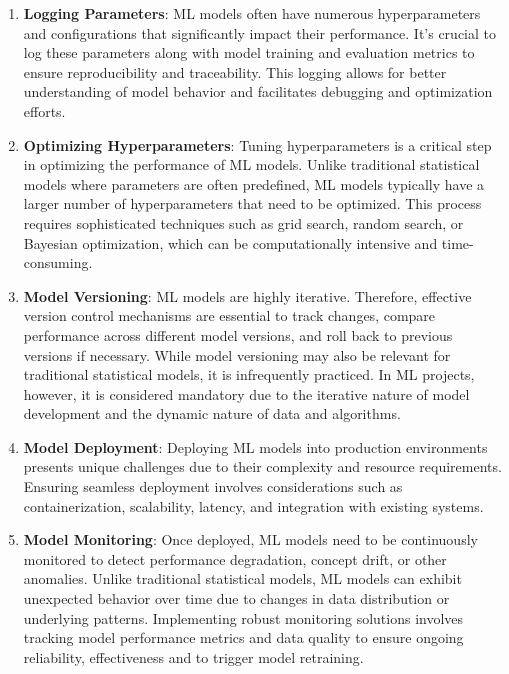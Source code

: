 \begin{enumerate}
    \item \textbf{Logging Parameters}: ML models often have numerous hyperparameters and configurations that significantly impact their performance. It's crucial to log these parameters along with model training and evaluation metrics to ensure reproducibility and traceability. This logging allows for better understanding of model behavior and facilitates debugging and optimization efforts.
    
    \item \textbf{Optimizing Hyperparameters}: Tuning hyperparameters is a critical step in optimizing the performance of ML models. Unlike traditional statistical models where parameters are often predefined, ML models typically have a larger number of hyperparameters that need to be optimized. This process requires sophisticated techniques such as grid search, random search, or Bayesian optimization, which can be computationally intensive and time-consuming.
    
    \item \textbf{Model Versioning}: ML models are highly iterative. Therefore, effective version control mechanisms are essential to track changes, compare performance across different model versions, and roll back to previous versions if necessary. While model versioning may also be relevant for traditional statistical models, it is infrequently practiced. In ML projects, however, it is considered mandatory due to the iterative nature of model development and the dynamic nature of data and algorithms.
    
    \item \textbf{Model Deployment}: Deploying ML models into production environments presents unique challenges due to their complexity and resource requirements. Ensuring seamless deployment involves considerations such as containerization, scalability, latency, and integration with existing systems.
    
    \item \textbf{Model Monitoring}: Once deployed, ML models need to be continuously monitored to detect performance degradation, concept drift, or other anomalies. Unlike traditional statistical models, ML models can exhibit unexpected behavior over time due to changes in data distribution or underlying patterns. Implementing robust monitoring solutions involves tracking model performance metrics and data quality to ensure ongoing reliability, effectiveness and to trigger model retraining.


\end{enumerate}
